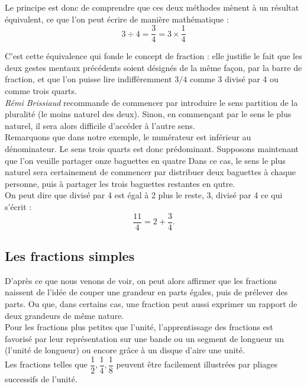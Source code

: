 Le principe est donc de comprendre que ces deux méthodes mènent à un résultat équivalent, ce que l'on peut écrire de manière mathématique :
$$3\div4 = \dfrac34 =3\times\dfrac14$$

C'est cette équivalence qui fonde le concept de fraction : elle justifie le fait que les deux gestes mentaux précédents soient désignés de la même façon, par la barre de fraction, et que l'on puisse lire indifféremment $3/4$ comme 3 divisé par 4 ou comme trois quarts. \\

{\it Rémi Brissiaud} recommande de commencer par introduire le sens partition de la pluralité (le moins naturel des deux). Sinon, en commençant par le sens le plus naturel, il sera alors difficile d’accéder à l’autre sens. \\

Remarquons que dans notre exemple, le numérateur est inférieur au dénominateur. Le sens \og trois quarts \fg{} est donc prédominant. Supposons maintenant que l'on veuille partager onze baguettes en quatre Dans ce cas, le sens le plus naturel sera certainement de commencer par distribuer deux baguettes à chaque personne, puis à partager les trois baguettes restantes en qutre. \\
On peut dire que  divisé par 4 est égal à 2 plus le reste, 3, divisé par 4 \fg{} ce qui s'écrit :
$$\dfrac{11}4 =2+\dfrac34.$$


\subsection{Les fractions simples} %

D'après ce que nous venons de voir, on peut alors affirmer que les fractions naissent de l’idée de couper une grandeur en parts égales, puis de prélever des parts. Ou que, dans certains cas, une fraction peut aussi exprimer un rapport de deux grandeurs de même nature. \\

Pour les fractions plus petites que l'unité, l'apprentissage des fractions est favorisé par leur représentation sur une bande ou un segment de longueur \og un \fg{} (l'unité de longueur) ou encore grâce à un disque d'aire une unité. \\ [1mm]
Les fractions telles que $\dfrac12, \dfrac14, \dfrac18$ peuvent être facilement illustrées par pliages successifs de l'unité.

